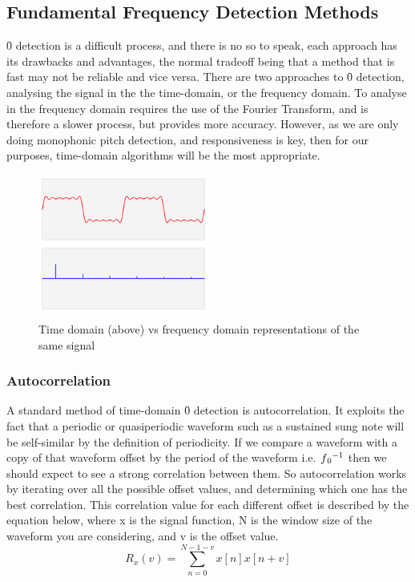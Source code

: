 	
	\subsection{Fundamental Frequency Detection Methods}
	
	\f0 detection is a difficult process, and there is no  so to speak, each approach has its drawbacks and advantages, the normal tradeoff being that a method that is fast may not be reliable and vice versa.
	There are two approaches to \f0 detection, analysing the signal in the the time-domain, or the frequency domain. To analyse in the frequency domain requires the use of the Fourier Transform, and is therefore a slower process, but provides more accuracy. However, as we are only doing monophonic pitch detection, and responsiveness is key, then for our purposes, time-domain algorithms will be the most appropriate.
	\begin{figure}[h!]
  		\caption{Time domain (above) vs frequency domain representations of the same signal}
  		\centering
    	\includegraphics[width=0.5\textwidth]{assets/time-frequency.png}
	\end{figure}
		\subsubsection{Autocorrelation}
		A standard method of time-domain \f0 detection is autocorrelation. It exploits the fact that a periodic or quasiperiodic waveform such as a sustained sung note will be self-similar by the definition of periodicity. If we compare a waveform with a copy of that waveform offset by the period of the waveform i.e. \(\f0 ^{-1}\) then we should expect to see a strong correlation between them. So autocorrelation works by iterating over all the possible offset values, and determining which one has the best correlation. This correlation value for each different offset is described by the equation below, where x is the signal function, N is the window size of the waveform you are considering, and v is the offset value.  \[R_x(v) = \sum_{n=0}^{N-1-v} x[n]x[n+v]\]
	